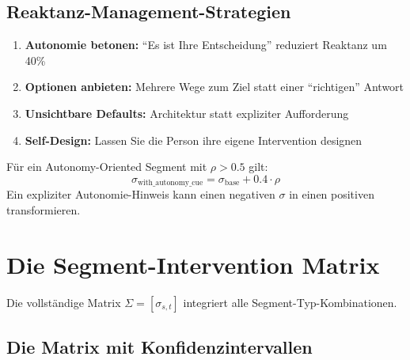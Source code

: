 \subsection{Reaktanz-Management-Strategien}

\begin{enumerate}
\item \textbf{Autonomie betonen:} ``Es ist Ihre Entscheidung'' reduziert Reaktanz um 40\%
\item \textbf{Optionen anbieten:} Mehrere Wege zum Ziel statt einer ``richtigen'' Antwort
\item \textbf{Unsichtbare Defaults:} Architektur statt expliziter Aufforderung
\item \textbf{Self-Design:} Lassen Sie die Person ihre eigene Intervention designen
\end{enumerate}

\begin{theorem}
\label{thm:19-reactance}
Für ein Autonomy-Oriented Segment mit $\rho > 0.5$ gilt:
\begin{equation}
\sigma_{\text{with\_autonomy\_cue}} = \sigma_{\text{base}} + 0.4 \cdot \rho
\label{eq:19-reactance-mitigation}
\end{equation}
Ein expliziter Autonomie-Hinweis kann einen negativen $\sigma$ in einen positiven transformieren.
\end{theorem}


\section{Die Segment-Intervention Matrix}
\label{sec:19-matrix}

Die vollständige Matrix $\Sigma = [\sigma_{s,t}]$ integriert alle Segment-Typ-Kombinationen.

\subsection{Die Matrix mit Konfidenzintervallen}

